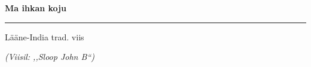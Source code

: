 \documentclass[10pt]{book}
\begin{document}
{
  \samepage
  \raggedbottom
  \raggedright
  \sloppy


  \vspace{0.2in}
    \centerline{
      \bfseries
      \large Ma ihkan koju
    }
  \nopagebreak[4]
  \vspace{0.1in}
  \nopagebreak[4]
  \hrule height 0.05ex
  \nopagebreak[4]
  \vspace{-0.05in}

  {\footnotesize  \hfill L\"a\"ane-India trad. viis }\\
  \vspace{0.01in}

  {\em {\footnotesize (Viisil: ,,Sloop John B{``}) } }
  \vspace{0.01in}


}
\end{document}
